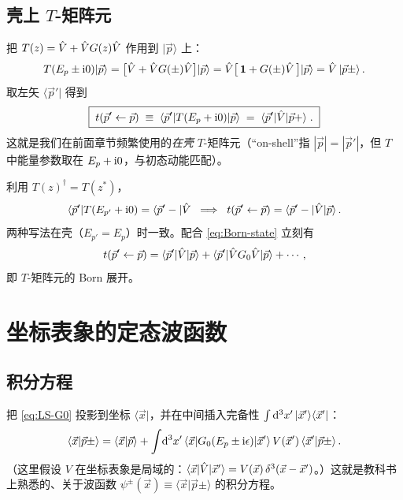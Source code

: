 \subsection{壳上 $T$-矩阵元}

把 $T(z) = \hat{V} + \hat{V} G(z)\hat{V}$ 作用到 $|\vec p\rangle$ 上：
\begin{equation}
  T(E_p\pm \mathrm{i} 0)|\vec p\rangle
  = \big[\hat{V} + \hat{V} G(\pm)\hat{V}\big]|\vec p\rangle
  = \hat{V}\big[\,\mathbf{1}+G(\pm)\hat{V}\,\big]|\vec p\rangle
  = \hat{V}\,|\vec p\pm\rangle\,.
  \label{eq:T-on-p}
\end{equation}
取左矢 $\langle\vec p'|$ 得到
\begin{equation}
  \boxed{\;t(\vec p'\leftarrow \vec p) \;\equiv\; \langle\vec p'|T(E_p+\mathrm{i} 0)|\vec p\rangle
  \;=\; \langle\vec p'|\hat{V}|\vec p+\rangle\;.\;}
  \label{eq:t-onshell-1}
\end{equation}
这就是我们在前面章节频繁使用的\emph{在壳} $T$-矩阵元（``on-shell''指 $|\vec p|=
|\vec p'|$，但 $T$ 中能量参数取在 $E_p+\mathrm{i} 0$，与初态动能匹配）。

利用 $T(z)^\dagger = T(z^*)$，
\begin{equation}
  \langle\vec p'|T(E_{p'}+\mathrm{i} 0) = \langle\vec p' -|\hat{V}
  \;\;\Longrightarrow\;\;
  t(\vec p'\leftarrow \vec p) = \langle\vec p'-|\hat{V}|\vec p\rangle\,.
  \label{eq:t-onshell-2}
\end{equation}
两种写法在壳（$E_{p'}=E_p$）时一致。配合 \eqref{eq:Born-state} 立刻有
\begin{equation}
  t(\vec p'\leftarrow \vec p)
  = \langle\vec p'|\hat{V}|\vec p\rangle
  + \langle\vec p'|\hat{V} G_0\hat{V}|\vec p\rangle + \cdots\,,
\end{equation}
即 $T$-矩阵元的 Born 展开。

\section{坐标表象的定态波函数}

\subsection{积分方程}

把 \eqref{eq:LS-G0} 投影到坐标 $\langle\vec x|$，并在中间插入完备性
$\int\mathrm{d}^3 x'\,|\vec x'\rangle\langle\vec x'|$：
\begin{equation}
  \langle\vec x|\vec p\pm\rangle
  = \langle\vec x|\vec p\rangle
  + \int\!\mathrm{d}^3 x'\,\langle\vec x|G_0(E_p\pm\mathrm{i}\epsilon)|\vec x'\rangle\,
    V(\vec x')\,\langle\vec x'|\vec p\pm\rangle\,.
  \label{eq:LS-coord}
\end{equation}
（这里假设 $V$ 在坐标表象是局域的：$\langle\vec x|\hat{V}|\vec x'\rangle =
V(\vec x)\,\delta^3(\vec x-\vec x')$。）这就是教科书上熟悉的、关于波函数
$\psi^\pm(\vec x) \equiv \langle\vec x|\vec p\pm\rangle$ 的积分方程。

